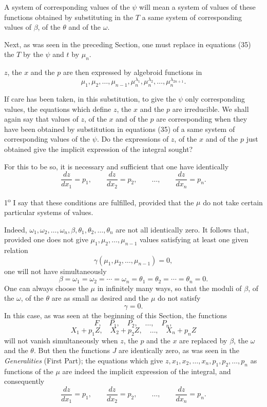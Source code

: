 \documentclass[11pt]{article}
\begin{document}
A system of corresponding values of the $\psi$ will mean a system of values of these functions obtained by substituting in the $T$ a same system of corresponding values of $\beta$, of the $\theta$ and of the $\omega$.

Next, as was seen in the preceding Section, one must replace in equations (35) the $T$ by the $\psi$ and $t$ by $\mu_n$.

$z$, the $x$ and the $p$ are then expressed by algebroid functions in
\[
\mu_1,\mu_2,\ldots,\mu_{n-1},\mu_n^{\lambda_1},\mu_n^{\lambda_2},\ldots,\mu_n^{\lambda_{2n+1}}.
\]

If care has been taken, in this substitution, to give the $\psi$ only corresponding values, the equations which define $z$, the $x$ and the $p$ are irreducible. We shall again say that values of $z$, of the $x$ and of the $p$ are corresponding when they have been obtained by substitution in equations (35) of a same system of corresponding values of the $\psi$. Do the expressions of $z$, of the $x$ and of the $p$ just obtained give the implicit expression of the integral sought?

For this to be so, it is necessary and sufficient that one have identically
\[
\frac{dz}{dx_1}=p_1,
\qquad
\frac{dz}{dx_2}=p_2,
\qquad \ldots,
\qquad
\frac{dz}{dx_n}=p_n.
\]

1\textsuperscript{o} I say that these conditions are fulfilled, provided that the $\mu$ do not take certain particular systems of values.

Indeed, $\omega_1,\omega_2,\ldots,\omega_n,\beta,\theta_1,\theta_2,\ldots,\theta_n$ are not all identically zero. It follows that, provided one does not give $\mu_1,\mu_2,\ldots,\mu_{n-1}$ values satisfying at least one given relation
\[
\gamma(\mu_1,\mu_2,\ldots,\mu_{n-1})=0,
\]
one will not have simultaneously
\[
\beta=\omega_1=\omega_2=\cdots=\omega_n=\theta_1=\theta_2=\cdots=\theta_n=0.
\]
One can always choose the $\mu$ in infinitely many ways, so that the moduli of $\beta$, of the $\omega$, of the $\theta$ are as small as desired and the $\mu$ do not satisfy
\[
\gamma=0.
\]
In this case, as was seen at the beginning of this Section, the functions
\[
F,\quad P_1,\quad P_2,\quad \ldots,\quad P_n,
\]
\[
X_1+p_1Z,\quad X_2+p_2Z,\quad \ldots,\quad X_n+p_nZ
\]
will not vanish simultaneously when $z$, the $p$ and the $x$ are replaced by $\beta$, the $\omega$ and the $\theta$. But then the functions $J$ are identically zero, as was seen in the \emph{Generalities} (First Part); the equations which give $z,x_1,x_2,\ldots,x_n,p_1,p_2,\ldots,p_n$ as functions of the $\mu$ are indeed the implicit expression of the integral, and consequently
\[
\frac{dz}{dx_1}=p_1,
\qquad
\frac{dz}{dx_2}=p_2,
\qquad \ldots,
\qquad
\frac{dz}{dx_n}=p_n.
\]
\end{document}
